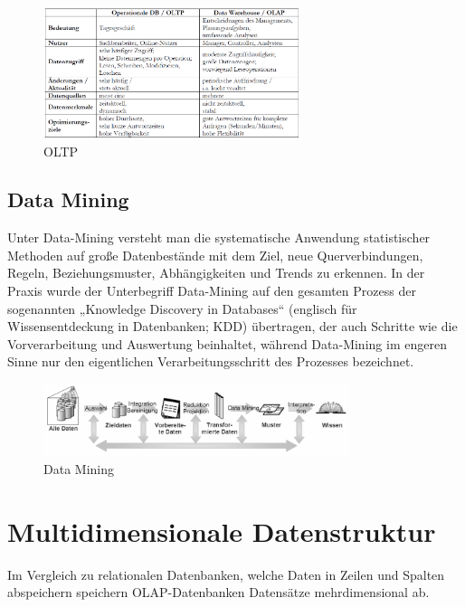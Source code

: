 \begin{figure}[H]
    \centering
    \includegraphics[width=0.67\textwidth]{Content/images/dwh/oltp.png}
    \caption{OLTP}
    \label{fig:dwh:oltp}
\end{figure}

\subsection{Data Mining}

Unter Data-Mining versteht man die systematische Anwendung statistischer Methoden auf große Datenbestände mit dem Ziel, neue Querverbindungen, Regeln, Beziehungsmuster, Abhängigkeiten und Trends zu erkennen. 
In der Praxis wurde der Unterbegriff Data-Mining auf den gesamten Prozess der sogenannten „Knowledge Discovery in Databases“ (englisch für Wissensentdeckung in Datenbanken; KDD) übertragen, der auch Schritte wie die Vorverarbeitung und Auswertung beinhaltet, während Data-Mining im engeren Sinne nur den eigentlichen Verarbeitungsschritt des Prozesses bezeichnet.

\begin{figure}[H]
    \centering
    \includegraphics[width=0.8\textwidth]{Content/images/dwh/mining.png}
    \caption{Data Mining}
    \label{fig:dwh:mining}
\end{figure}

\section{Multidimensionale Datenstruktur}

Im Vergleich zu relationalen Datenbanken, welche Daten in Zeilen und Spalten abspeichern speichern OLAP-Datenbanken Datensätze mehrdimensional ab.

